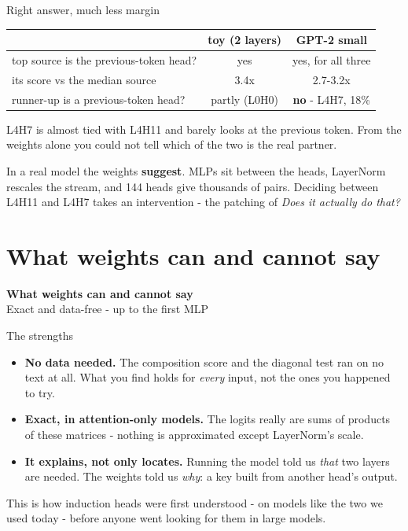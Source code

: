\documentclass[aspectratio=169]{beamer}
\newcommand{\keybox}[1]{%
  \begin{tcolorbox}[colback=armblue!8, colframe=armblue, boxrule=0.6pt, arc=2pt]
  #1
  \end{tcolorbox}}
\newcommand{\watchbox}[1]{%
  \begin{tcolorbox}[colback=armorange!12, colframe=armorange, boxrule=0.6pt, arc=2pt]
  #1
  \end{tcolorbox}}
\newcommand{\sectiontransition}[2]{%
  \begin{frame}[plain]
    \vfill
    \begin{center}
      {\Huge\bfseries\color{popblue} #1}\\[1.1em]
      {\large #2}
    \end{center}
    \vfill
  \end{frame}}
\begin{document}
\begin{frame}{Right answer, much less margin}
  \vspace{0.5em}
  \begin{center}
  \small
  \begin{tabular}{@{}lcc@{}}
    \toprule
    & \textbf{toy (2 layers)} & \textbf{GPT-2 small}\\
    \midrule
    top source is the previous-token head? & yes & yes, for all three\\
    its score vs the median source & 3.4x & 2.7-3.2x\\
    runner-up is a previous-token head? & partly (L0H0) & \textbf{no} - L4H7, 18\%\\
    \bottomrule
  \end{tabular}
  \end{center}

  \vspace{0.6em}
  L4H7 is almost tied with L4H11 and barely looks at the previous token. From the weights alone you
  could not tell which of the two is the real partner.

  \vspace{0.5em}
  \watchbox{\small In a real model the weights \textbf{suggest}. MLPs sit between the heads,
  LayerNorm rescales the stream, and 144 heads give thousands of pairs. Deciding between L4H11 and
  L4H7 takes an intervention - the patching of \emph{Does it actually do that?}}
\end{frame}

\section{What weights can and cannot say}
\sectiontransition{What weights can and cannot say}{Exact and data-free - up to the first MLP}

\begin{frame}{The strengths}
  \vspace{0.6em}
  \begin{itemize}
    \item \textbf{No data needed.} The composition score and the diagonal test ran on no text at
      all. What you find holds for \emph{every} input, not the ones you happened to try.
    \item \textbf{Exact, in attention-only models.} The logits really are sums of products of these
      matrices - nothing is approximated except LayerNorm's scale.
    \item \textbf{It explains, not only locates.} Running the model told us \emph{that} two layers
      are needed. The weights told us \emph{why}: a key built from another head's output.
  \end{itemize}

  \vspace{0.6em}
  \keybox{\small This is how induction heads were first understood - on models like the two we used
  today - before anyone went looking for them in large models.}
\end{frame}
\end{document}
